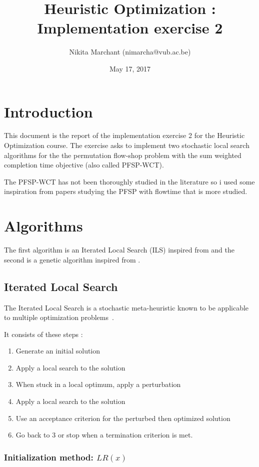 \documentclass[a4paper]{article}
\title{Heuristic Optimization : Implementation exercise 2}
\date{May 17, 2017}
\author{Nikita Marchant (nimarcha@vub.ac.be)}
\begin{document}
\maketitle

\section{Introduction}

This document is the report of the implementation exercise 2 for the Heuristic Optimization course.
The exercise asks to implement two stochastic local search algorithms for the the permutation flow-shop problem with the sum weighted completion time objective (also called PFSP-WCT).

The PFSP-WCT has not been thoroughly studied in the literature so i used some inspiration from papers studying the PFSP with flowtime that is more studied.

\section{Algorithms}

The first algorithm is an Iterated Local Search (ILS) inspired from \cite{panruiz2012} and the second is a genetic algorithm inspired from \cite{zhang2009}.

\subsection{Iterated Local Search}

The Iterated Local Search is a stochastic meta-heuristic
known to be applicable to multiple optimization problems~\cite{Lourenco2010}.

It consists of these steps :

\begin{enumerate}
    \item Generate an initial solution
    \item Apply a local search to the solution
    \item When stuck in a local optimum, apply a perturbation
    \item Apply a local search to the solution
    \item Use an acceptance criterion for the perturbed then optimized solution
    \item Go back to 3 or stop when a termination criterion is met.
\end{enumerate}

\subsubsection{Initialization method: $LR(x)$}
\label{LR}
\end{document}
